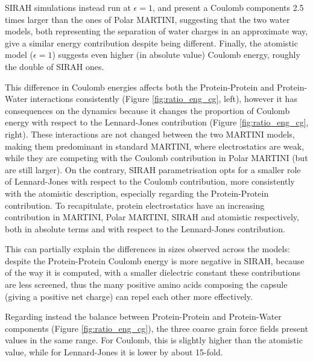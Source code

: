SIRAH simulations instead run at $\epsilon = 1$, and present a Coulomb components 2.5 times larger than the ones of Polar MARTINI, suggesting that the two water models, both representing the separation of water charges in an approximate way, give a similar energy contribution despite being different.
%
Finally, the atomistic model ($\epsilon = 1$) suggests even higher (in absolute value) Coulomb energy, roughly the double of SIRAH ones.


This difference in Coulomb energies affects both the Protein-Protein and Protein-Water interactions consistently (Figure \ref{fig:ratio_eng_cg}, left), however it has consequences on the dynamics because it changes the proportion of Coulomb energy with respect to the Lennard-Jones contribution (Figure \ref{fig:ratio_eng_cg}, right). These interactions are not changed between the two MARTINI models, making them predominant in standard MARTINI, where electrostatics are weak, while they are competing with the Coulomb contribution in Polar MARTINI (but are still larger).
%
On the contrary, SIRAH parametrisation opts for a smaller role of Lennard-Jones with respect to the Coulomb contribution, more consistently with the atomistic description, especially regarding the Protein-Protein contribution.
%
To recapitulate, protein electrostatics have an increasing contribution in MARTINI, Polar MARTINI, SIRAH and atomistic respectively, both in absolute terms and with respect to the Lennard-Jones contribution.

This can partially explain the differences in sizes observed across the models: despite the Protein-Protein Coulomb energy is more negative in SIRAH, because of the way it is computed, with a smaller dielectric constant these contributions are less screened, thus the many positive amino acids composing the capsule (giving a positive net charge) can repel each other more effectively.

Regarding instead the balance between Protein-Protein and Protein-Water components (Figure \ref{fig:ratio_eng_cg}), the three coarse grain force fields present values in the same range.
%
For Coulomb, this is slightly higher than the atomistic value, while for Lennard-Jones it is lower by about 15-fold.

